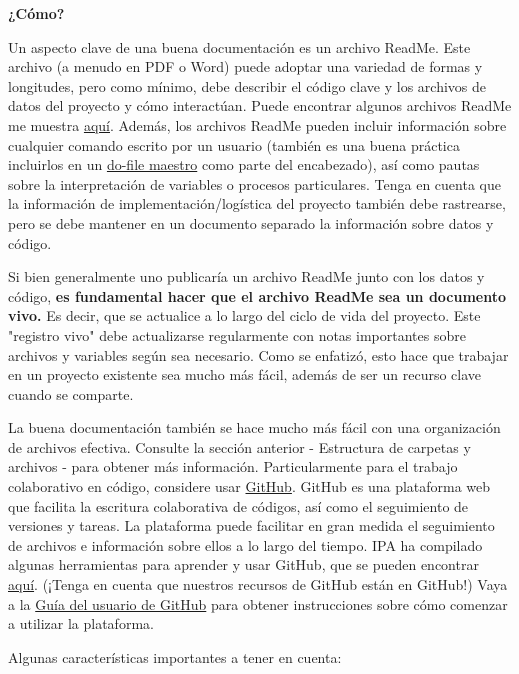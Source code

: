 \documentclass[11pt,en]{elegantpaper}
\begin{document}
\noindent
\textbf{¿Cómo?}

Un aspecto clave de una buena documentación es un archivo ReadMe. Este archivo (a menudo en PDF o Word) puede adoptar una variedad de formas y longitudes, pero como mínimo, debe describir el código clave y los archivos de datos del proyecto y cómo interactúan. Puede encontrar algunos archivos ReadMe me muestra \href{http://www.poverty-action.org/research-transparency/example-readme-files}{aquí}. Además, los archivos ReadMe pueden incluir información sobre cualquier comando escrito por un usuario (también es una buena práctica incluirlos en un \href{http://www.poverty-action.org/research-transparency/example-master}{do-file maestro} como parte del encabezado), así como pautas sobre la interpretación de variables o procesos particulares. Tenga en cuenta que la información de implementación/logística del proyecto también debe rastrearse, pero se debe mantener en un documento separado la información sobre datos y código.

Si bien generalmente uno publicaría un archivo ReadMe junto con los datos y código, \textbf{es fundamental hacer que el archivo ReadMe sea un documento vivo.} Es decir, que se actualice a lo largo del ciclo de vida del proyecto. Este "registro vivo" debe actualizarse regularmente con notas importantes sobre archivos y variables según sea necesario. Como se enfatizó, esto hace que trabajar en un proyecto existente sea mucho más fácil, además de ser un recurso clave cuando se comparte.

La buena documentación también se hace mucho más fácil con una organización de archivos efectiva. Consulte la sección anterior - Estructura de carpetas y archivos - para obtener más información. Particularmente para el trabajo colaborativo en código, considere usar \href{https://github.com/}{GitHub}. GitHub es una plataforma web que facilita la escritura colaborativa de códigos, así como el seguimiento de versiones y tareas. La plataforma puede facilitar en gran medida el seguimiento de archivos e información sobre ellos a lo largo del tiempo. IPA ha compilado algunas herramientas para aprender y usar GitHub, que se pueden encontrar \href{https://github.com/PovertyAction/github-training}{aquí}. (¡Tenga en cuenta que nuestros recursos de GitHub están en GitHub!) Vaya a la \href{https://github.com/PovertyAction/github-training/blob/master/resources/GitHub\%20User\%20Guide.md}{Guía del usuario de GitHub} para obtener instrucciones sobre cómo comenzar a utilizar la plataforma.

Algunas características importantes a tener en cuenta:
\end{document}

